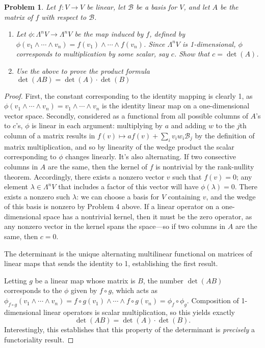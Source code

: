 \documentclass{article}
\newtheorem{plm}{Problem}
\begin{document}
\begin{plm}
  Let $f: V \to V$ be linear, let $\mathcal{B}$ be a basis for $V$, and let $A$ be the matrix of $f$ with respect to $\mathcal{B}$.
  \begin{enumerate}
  \item Let $\phi: \Lambda^{n}V \to \Lambda^{n}V$ be the map induced by $f$, defined by
    $\phi(v_{1} \land \cdots \land v_{n}) = f(v_{1}) \land \cdots \land f(v_{n})$.
    Since $\Lambda^{n}V$ is 1-dimensional, $\phi$ corresponds to multiplication by some scalar, say $c$.
    Show that $c = \det(A)$.

  \item Use the above to prove the product formula $\det(AB) = \det(A) \cdot \det(B)$
  \end{enumerate}
\end{plm}

\begin{proof}
  First, the constant corresponding to the identity mapping is clearly 1, as $\phi(v_{1} \wedge \cdots \wedge v_{n})
  = v_{1} \wedge \cdots \wedge v_{n}$ is the identity linear map on a one-dimensional vector space.
  Secondly, considered as a functional from all possible columns of $A$'s to $c$'s,
  $\phi$ is linear in each argument: multiplying by $a$ and adding $w$ to the $j$th column of a matrix results in
  $f(v) \mapsto af(v) + \sum_{i}v_{i}w_{i}\mathcal{B}_{j}$ by the definition of matrix multiplication,
  and so by linearity of the wedge product the scalar corresponding to $\phi$ changes linearly.
  It's also alternating.
  If two consective columns in $A$ are the same, then the kernel of $f$ is nontrivial by the rank-nullity theorem.
  Accordingly, there exists a nonzero vector $v$ such that $f(v) = 0$; any element $\lambda \in \Lambda^{n}V$
  that includes a factor of this vector will have $\phi(\lambda) = 0$.
  There exists a nonzero such $\lambda$: we can choose a basis for $V$ containing $v$, and the wedge of this basis is nonzero
  by Problem 4 above.
  If a linear operator on a one-dimensional space has a nontrivial kernel, then it must be the zero operator,
  as any nonzero vector in the kernel spans the space---so if two columns in $A$ are the same, then $c = 0$.

  The determinant is the unique alternating multilinear functional on matrices of linear maps that sends the identity to 1,
  establishing the first result.

  Letting $g$ be a linear map whose matrix is $B$, the number $\det(AB)$ corresponds to the $\phi$ given by $f \circ g$,
  which acts as $\phi_{f\circ g}(v_{1} \wedge \cdots \wedge v_{n}) = f \circ g(v_{1}) \wedge \cdots \wedge f \circ g(v_n) = \phi_f \circ \phi_g$.
  Composition of 1-dimensional linear operators is scalar multiplication, so this yields exactly
  \[
    \det(AB) = \det(A) \cdot \det(B).
  \]
  Interestingly, this establishes that this property of the determinant is \textit{precisely} a functoriality result.
\end{proof}
\end{document}
